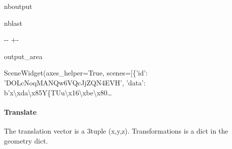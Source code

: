 \documentclass[letterpaper,10pt,english]{sphinxmanual}
\begin{document}
\begin{sphinxuseclass}{nboutput}
\begin{sphinxuseclass}{nblast}
{

\kern-\sphinxverbatimsmallskipamount\kern-\baselineskip
\kern+\FrameHeightAdjust\kern-\fboxrule
\vspace{\nbsphinxcodecellspacing}

\begin{sphinxuseclass}{output_area}
\begin{sphinxuseclass}{}


\begin{sphinxVerbatim}[commandchars=\\\{\}]
\llap{\color{nbsphinxout}[14]:\,\hspace{\fboxrule}\hspace{\fboxsep}}SceneWidget(axes\_helper=True, scenes=[\{'id': 'DOLcNoqMANQw6VQcJjZQN4EVH', 'data': b'x\textbackslash{}xda\textbackslash{}x85Y\{TUu\textbackslash{}x16\textbackslash{}xbe\textbackslash{}x80…
\end{sphinxVerbatim}



\end{sphinxuseclass}
\end{sphinxuseclass}
}

\end{sphinxuseclass}
\end{sphinxuseclass}

\paragraph{Translate}
\label{\detokenize{input_scenes:Translate}}
\sphinxAtStartPar
The translation vector is a 3\sphinxhyphen{}tuple (x,y,z). Transformations is a dict in the geometry dict.
\end{document}
